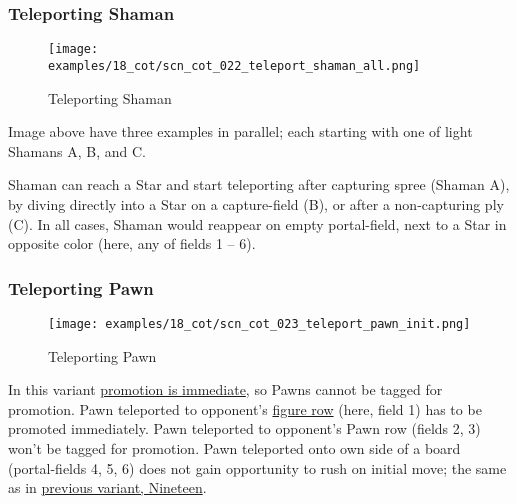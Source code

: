 \clearpage %

\subsubsection*{Teleporting Shaman}
\label{sec:Conquest of Tlalocan/Shaman/Movement/Teleporting Shaman}

\vspace*{-1.4\baselineskip}
\noindent
\begin{figure}[!h]
\texttt{[image: examples/18\_cot/scn\_cot\_022\_teleport\_shaman\_all.png]}
\vspace*{-1.4\baselineskip}
\caption{Teleporting Shaman}
\label{fig:scn_cot_022_teleport_shaman_all}
\end{figure}

\vspace*{-0.4\baselineskip}
Image above have three examples in parallel; each starting with one of light
Shamans A, B, and C.

Shaman can reach a Star and start teleporting after capturing spree (Shaman A),
by diving directly into a Star on a capture-field (B), or after a non-capturing
ply (C). In all cases, Shaman would reappear on empty portal-field, next to a
Star in opposite color (here, any of fields 1 -- 6).

\clearpage %

\subsubsection*{Teleporting Pawn}
\label{sec:Conquest of Tlalocan/Shaman/Movement/Teleporting Pawn}

\vspace*{-1.4\baselineskip}
\noindent
\begin{figure}[!h]
\texttt{[image: examples/18\_cot/scn\_cot\_023\_teleport\_pawn\_init.png]}
\vspace*{-1.4\baselineskip}
\caption{Teleporting Pawn}
\label{fig:scn_cot_023_teleport_pawn_init}
\end{figure}

\vspace*{-0.4\baselineskip}
In this variant
\hyperref[sec:Conquest of Tlalocan/Promotion]{promotion is immediate}, so Pawns
cannot be tagged for promotion.
Pawn teleported to opponent's \hyperref[sec:Terms/Figure row]{figure row} (here,
field 1) has to be promoted immediately. Pawn teleported to opponent's Pawn row
(fields 2, 3) won't be tagged for promotion.\newline
\indent
Pawn teleported onto own side of a board (portal-fields 4, 5, 6) does not gain
opportunity to rush on initial move; the same as in
\hyperref[fig:scn_n_12_teleport_pawns_step_1]{previous variant, Nineteen}.

